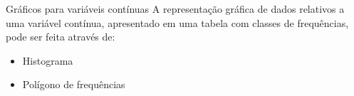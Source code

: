 \documentclass[
  ignorenonframetext,
]{beamer}
\newenvironment{Shaded}{\begin{snugshade}}{\end{snugshade}}
\newcommand{\AttributeTok}[1]{\textcolor[rgb]{0.40,0.45,0.13}{#1}}
\newcommand{\DecValTok}[1]{\textcolor[rgb]{0.68,0.00,0.00}{#1}}
\newcommand{\FunctionTok}[1]{\textcolor[rgb]{0.28,0.35,0.67}{#1}}
\newcommand{\NormalTok}[1]{\textcolor[rgb]{0.00,0.23,0.31}{#1}}
\newcommand{\OtherTok}[1]{\textcolor[rgb]{0.00,0.23,0.31}{#1}}
\newcommand{\SpecialCharTok}[1]{\textcolor[rgb]{0.37,0.37,0.37}{#1}}
\providecommand{\tightlist}{%
  \setlength{\itemsep}{0pt}\setlength{\parskip}{0pt}}\usepackage{longtable,booktabs,array}
\begin{document}
\begin{frame}[fragile]
\begin{Shaded}
\end{Shaded}
\end{frame}

\begin{frame}
\begin{block}{Gráficos para variáveis contínuas}
\label{gruxe1ficos-para-variuxe1veis-contuxednuas}
A representação gráfica de dados relativos a uma variável contínua,
apresentado em uma tabela com classes de frequências, pode ser feita
através de:

\begin{itemize}
\tightlist
\item
  Histograma
\end{itemize}

\begin{itemize}
\tightlist
\item
  Polígono de frequências
\end{itemize}
\end{block}
\end{frame}
\end{document}
